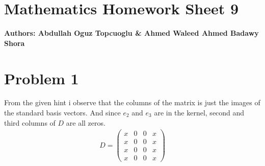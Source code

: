 \documentclass{article}
\begin{document}
\section*{\huge Mathematics Homework Sheet 9}
\begin{flushright}
   \textbf{Authors: Abdullah Oguz Topcuoglu \& Ahmed Waleed Ahmed Badawy Shora}
\end{flushright}




\section*{Problem 1}
From the given hint i observe that the columns of the matrix is just the images of the standard basis vectors.
And since \(e_2\) and \(e_3\) are in the kernel, second and third columns of \(D\) are all zeros.
\begin{align*}
D = \begin{pmatrix}
x & 0 & 0 & x \\
x & 0 & 0 & x \\
x & 0 & 0 & x \\
x & 0 & 0 & x
\end{pmatrix}
\end{align*}
\end{document}

